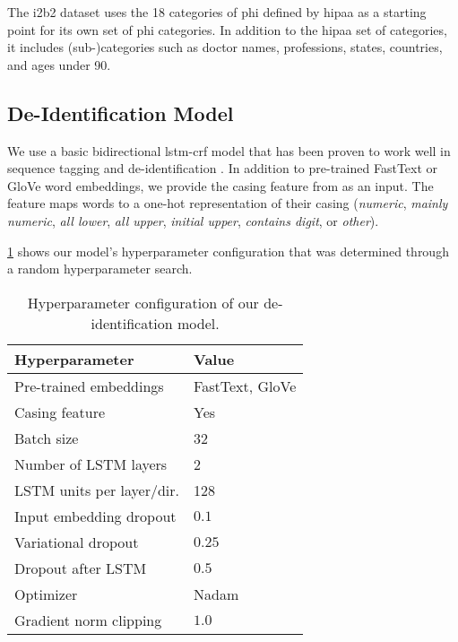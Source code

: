 %
The i2b2 dataset uses the 18 categories of \ac{phi} defined by \ac{hipaa} as a starting point for its own set of \ac{phi} categories.
%
In addition to the \ac{hipaa} set of categories, it includes (sub-)categories such as doctor names, professions, states, countries, and ages under 90.

\subsection{De-Identification Model}\label{sec:deidentification-model}
%
We use a basic bidirectional \ac{lstm}-\ac{crf} model that has been proven to work well in sequence tagging \citep{huang2015bidirectional,lample2016neural} and de-identification \citep{dernoncourt2017identification,liu2017identification}.
%
In addition to pre-trained FastText \citep{bojanowski2016enriching} or GloVe \citep{pennington2014glove} word embeddings, we provide the casing feature from \citet{reimers2017optimal} as an input.
%
The feature maps words to a one-hot representation of their casing (\textit{numeric}, \textit{mainly numeric}, \textit{all lower}, \textit{all upper}, \textit{initial upper}, \textit{contains digit}, or \textit{other}).

%
\cref{tab:deid-hyperparameters} shows our model's hyperparameter configuration that was determined through a random hyperparameter search.

\begin{table}
    \centering
    \begin{tabular}{ll}
     \toprule
     Hyperparameter & Value\\
     \midrule
     Pre-trained embeddings & FastText, GloVe\\
     Casing feature & Yes\\
     Batch size & 32\\
     Number of LSTM layers & 2\\
     LSTM units per layer/dir. & 128\\
     Input embedding dropout & $0.1$\\
     Variational dropout & $0.25$\\
     Dropout after LSTM & $0.5$\\
     Optimizer & Nadam\\
     Gradient norm clipping & $1.0$\\
     \bottomrule
    \end{tabular}
    \caption{Hyperparameter configuration of our de-identification model.}\label{tab:deid-hyperparameters}
\end{table}



